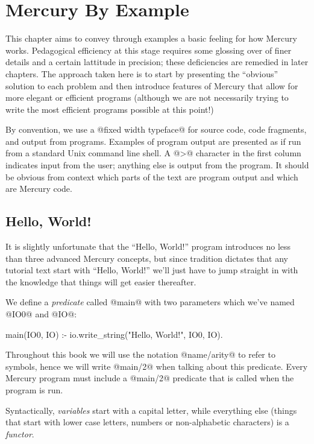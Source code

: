 
\chapter{Mercury By Example}

This chapter aims to convey through examples a basic feeling for how
Mercury works.  Pedagogical efficiency at this stage requires some glossing
over of finer details and a certain lattitude in precision; these
deficiencies are remedied in later chapters.  The approach taken here is to
start by presenting the ``obvious'' solution to each problem and then
introduce features of Mercury that allow for more elegant or efficient
programs (although we are not necessarily trying to write the most efficient
programs possible at this point!)

By convention, we use a @fixed width typeface@ for source code, code
fragments, and output from programs.  Examples of program output are
presented as if run from a standard Unix command line shell.   A @>@ character in the first column
indicates input from the user; anything else is output from the program.  It
should be obvious from context which parts of the text are program output
and which are Mercury code.



\section{Hello, World!}

It is slightly unfortunate that the ``Hello, World!'' program introduces
no less than three advanced Mercury concepts, but since tradition
dictates that any tutorial text start with ``Hello, World!'' we'll just
have to jump straight in with the knowledge that things will get easier
thereafter.

We define a \emph{predicate} called @main@ with two parameters which
we've named @IO0@ and @IO@:
\begin{myverbatim}
main(IO0, IO) :-
    io.write_string("Hello, World!\n", IO0, IO).
\end{myverbatim}
Throughout this book we will use the
notation @name/arity@ to refer to symbols, hence we will write @main/2@
when talking about this predicate.  Every Mercury program must include a
@main/2@ predicate that is called when the program is run.

Syntactically, \emph{variables} start with a capital letter, while
everything else (things that start with lower case letters, numbers or
non-alphabetic characters) is a \emph{functor}.

